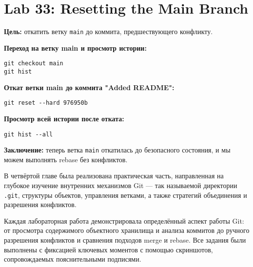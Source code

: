 \documentclass[a4paper,12pt]{report}
\begin{document}

\section{Lab 33: Resetting the Main Branch}

\textbf{Цель:} откатить ветку \texttt{main} до коммита, предшествующего конфликту.

\textbf{Переход на ветку main и просмотр истории:}
\begin{verbatim}
git checkout main
git hist
\end{verbatim}


\textbf{Откат ветки main до коммита "Added README":}
\begin{verbatim}
git reset --hard 976950b
\end{verbatim}


\textbf{Просмотр всей истории после отката:}
\begin{verbatim}
git hist --all
\end{verbatim}


\textbf{Заключение:} теперь ветка \texttt{main} откатилась до безопасного состояния, и мы можем выполнять rebase без конфликтов.


В четвёртой главе была реализована практическая часть, направленная на глубокое изучение внутренних механизмов Git — так называемой директории \texttt{.git}, структуры объектов, управления ветками, а также стратегий объединения и разрешения конфликтов.

Каждая лабораторная работа демонстрировала определённый аспект работы Git: от просмотра содержимого объектного хранилища и анализа коммитов до ручного разрешения конфликтов и сравнения подходов merge и rebase. Все задания были выполнены с фиксацией ключевых моментов с помощью скриншотов, сопровождаемых пояснительными подписями.
\end{document}
